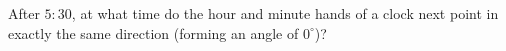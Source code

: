 After $5{:}30$, at what time do the hour and minute hands of a clock next point in exactly the same direction (forming an angle of $0^\circ$)?
